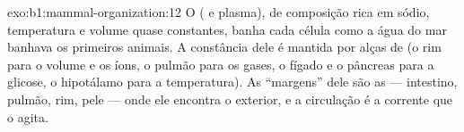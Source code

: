 \begin{solution}{exo:b1:mammal-organization:12}
O  ( e plasma), de composição
rica em sódio, temperatura e volume quase constantes, banha cada célula
como a água do mar banhava os primeiros animais. A constância dele é
mantida por alças de  (o rim para o volume e os
íons, o pulmão para os gases, o fígado e o pâncreas para a glicose, o
hipotálamo para a temperatura). As ``margens'' dele são as  --- intestino, pulmão, rim, pele --- onde ele encontra o
exterior, e a circulação é a corrente que o agita.
\end{solution}

